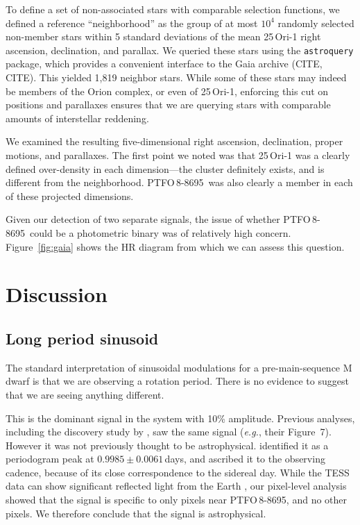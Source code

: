 \documentclass[12pt,twocolumn,tighten]{aastex62}
\newcommand{\ptfo}{PTFO$\,$8-8695}
\begin{document}
To define a set of non-associated stars with comparable selection
functions, we defined a reference ``neighborhood'' as the group of at
most $10^4$ randomly selected non-member stars within 5 standard
deviations of the mean 25$\,$Ori-1 right ascension, declination, and
parallax.  We queried these stars using the \texttt{astroquery}
package, which provides a convenient interface to the Gaia archive
(CITE, CITE).  This yielded 1{,}819 neighbor stars.  While some of
these stars may indeed be members of the Orion complex, or even of
25$\,$Ori-1, enforcing this cut on positions and parallaxes ensures
that we are querying stars with comparable amounts of interstellar
reddening.

We examined the resulting five-dimensional right ascension,
declination, proper motions, and parallaxes.  The first point we noted
was that 25$\,$Ori-1 was a clearly defined over-density in each
dimension---the cluster definitely exists, and is different from the
neighborhood.  \ptfo\ was also clearly a member in each of these
projected dimensions.

Given our detection of two separate signals, the issue of whether
\ptfo\ could be a photometric binary was of relatively high concern.
Figure~\ref{fig:gaia} shows the HR diagram from which we can assess
this question.


\section{Discussion}
\label{sec:discussion}

\subsection{Long period sinusoid}

The standard interpretation of sinusoidal modulations for a
pre-main-sequence M dwarf is that we are observing a rotation period.
There is no evidence to suggest that we are seeing anything different.

This is the dominant signal in the system with 10\% amplitude.
Previous analyses, including the discovery study by
\citet{van_eyken_ptf_2012}, saw the same signal ({\it e.g.}, their
Figure~7).  However it was not previously thought to be astrophysical.
\citet{van_eyken_ptf_2012} identified it as a periodogram peak at
$0.9985 \pm 0.0061\,$days, and ascribed it to the observing cadence,
because of its close correspondence to the sidereal day.  While the
TESS data can show significant reflected light from the Earth
\citep[{\it e.g.},][]{luger_tess_2019}, our pixel-level analysis
showed that the signal is specific to only pixels near \ptfo, and no
other pixels.  We therefore conclude that the signal is astrophysical.
\end{document}
